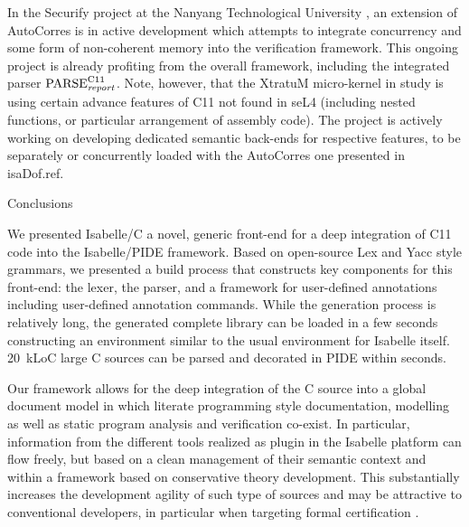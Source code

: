 \begin{isabellebody}
\begin{isamarkupsubsection*}
\end{isamarkupsubsection*}\isamarkuptrue%
%
\begin{isamarkuptext}%
In the Securify project at the Nanyang Technological University \cite{DBLP:conf/tacas/SananZHZTL17,DBLP:conf/itp/HouSTL17}, an extension of AutoCorres is in
active development which attempts to integrate concurrency and some form of non-coherent memory into
the verification framework. This ongoing project is already profiting from the overall framework,
including the integrated parser $\text{PARSE}_{\text{\emph{report}}}^{\text{C11}}$. Note, however,
that the XtratuM micro-kernel \cite{DBLP:journals/sigbed/CarrascosaCMBC14} in study is using
certain advance features of C11 not found in seL4 (including nested functions, or particular
arrangement of assembly code). The project is actively working on developing dedicated semantic
back-ends for respective features, to be separately or concurrently loaded with the AutoCorres one
presented in \csname isaDof.ref.%
\end{isamarkuptext}\isamarkuptrue%
%
\begin{isamarkupsection*}%
[label = {concl},type = {scholarly_paper.conclusion}, args={label = {concl},type = {scholarly_paper.conclusion}, scholarly_paper.text_section.main_author = {@{docitem ''bu''}}, Isa_COL.text_element.level = {}, Isa_COL.text_element.referentiable = {False}, Isa_COL.text_element.variants = {{STR ''outline'', STR ''document''}}, scholarly_paper.text_section.fixme_list = {}, Isa_COL.text_element.level = {}}]Conclusions%
\end{isamarkupsection*}\isamarkuptrue%
%
\begin{isamarkuptext}%
We presented Isabelle/C a novel, generic front-end for a deep integration of C11 code into the 
Isabelle/PIDE framework. Based on open-source Lex and Yacc style grammars, we presented a build process 
that constructs key components for this front-end: the lexer, the parser, and a framework for 
user-defined annotations including user-defined annotation commands. 
While the generation process is relatively long, the generated complete library can be loaded in a 
few seconds constructing an environment similar to the usual  environment for 
Isabelle itself. 20~kLoC large  C sources can be parsed and decorated in PIDE within  seconds.

Our framework allows for the deep integration of the C source into a global document model in which 
literate programming style documentation, modelling as well as static program analysis and verification 
co-exist.  In particular, information from the different tools realized as plugin in the Isabelle 
platform  can flow freely, but based on a clean management of their semantic context and within a 
framework based on conservative theory development. This substantially increases the development agility 
of such type of sources and may be  attractive to  conventional developers, in particular when 
targeting formal certification \cite{DBLP:conf/mkm/BruckerACW18}.


\end{isamarkuptext}
\end{isabellebody}
